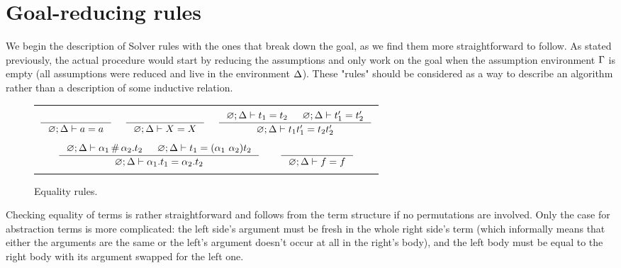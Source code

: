 \documentclass[english, mgr]{iithesis}
\newcommand{\solverRule}{\vdash}
\begin{document}
\section{Goal-reducing rules}
We begin the description of Solver rules with the ones that break down the goal,
as we find them more straightforward to follow.
As stated previously, the actual procedure would start by reducing the assumptions
and only work on the goal when the assumption environment $\Gamma$ is empty
(all assumptions were reduced and live in the environment $\Delta$).
These "rules" should be considered as a way to describe an algorithm
rather than a description of some inductive relation.

\begin{figure}[htbp]
    \centering
    \begin{tabularx}{\textwidth}{|C|}
      \hline \\ $
      \inference{
      }{
        \emptyenv ; \icEnv \solverRule \atomv = \atomv
      }
      \quad\;
      \inference{
      }{
        \emptyenv ; \icEnv \solverRule \termv = \termv
      }
      \quad\;
      \inference{
        \emptyenv ; \icEnv \solverRule \term_1 = \term_2
        &
        \emptyenv ; \icEnv \solverRule \term_1' = \term_2'
      }{
        \emptyenv ; \icEnv \solverRule \term_1 \term_1' = \term_2 \term_2'
      }
      $ \\ \\ $
      \inference{
        \emptyenv ; \icEnv \solverRule \atomexp_1 \cfresh \tbind{\atomexp_2}\term_2
        &
        \emptyenv ; \icEnv \solverRule \term_1 = \permswap{\atomexp_1}{\atomexp_2} \term_2
      }{
        \emptyenv ; \icEnv \solverRule \tbind{\atomexp_1} \term_1 = \tbind{\atomexp_2} \term_2
      } \qquad
      \inference{
      }{
        \emptyenv ; \icEnv \solverRule \symb = \symb
      }
      $ \\ \\ \hline
      \end{tabularx}
  \caption{Equality rules.}
  \label{fig:equality-reduction-rules}
\end{figure}
Checking equality of terms is rather straightforward and follows from the
term structure if no permutations are involved.
Only the case for abstraction terms is more complicated:
the left side's argument must be fresh in the whole right side's term
(which informally means that either the arguments are the same or
the left's argument doesn't occur at all in the right's body),
and the left body must be equal to the right body with its argument swapped for the left one.
\end{document}
